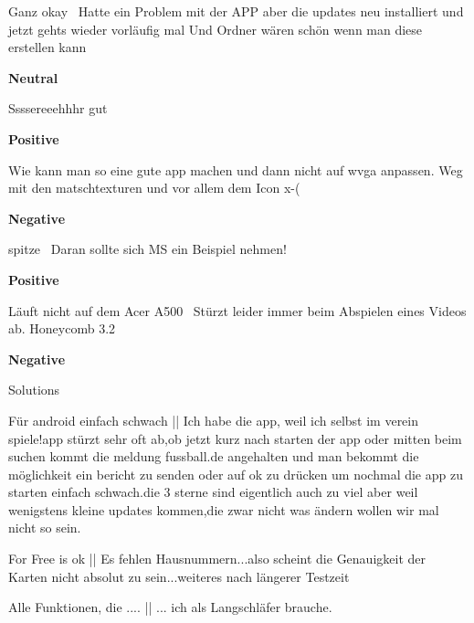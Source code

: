 \begin{examples}
  \item Ganz okay \textbar\textbar\ Hatte ein Problem mit der APP aber die updates neu installiert und jetzt gehts wieder vorläufig mal Und Ordner wären schön wenn man diese erstellen kann

        \textbf{Neutral}
  \item Ssssereeehhhr gut

        \textbf{Positive}
  \item Wie kann man so eine gute app machen und dann nicht auf wvga anpassen. Weg mit den matschtexturen und vor allem dem Icon x-(

        \textbf{Negative}
  \item spitze \textbar\textbar\ Daran sollte sich MS ein Beispiel nehmen!

        \textbf{Positive}
  \item Läuft nicht auf dem Acer A500 \textbar\textbar\ Stürzt leider immer beim Abspielen eines Videos ab. Honeycomb 3.2

        \textbf{Negative}
\end{examples}

Solutions

\begin{examples}
  \item \label{itm:scare1} Für android einfach schwach || Ich habe die app, weil ich selbst im verein spiele!app stürzt sehr oft ab,ob jetzt kurz nach starten der app oder mitten beim suchen kommt die meldung fussball.de angehalten und man bekommt die möglichkeit ein bericht zu senden oder auf ok zu drücken um nochmal die app zu starten einfach schwach.die 3 sterne sind eigentlich auch zu viel aber weil wenigstens kleine updates kommen,die zwar nicht was ändern wollen wir mal nicht so sein.
  \item \label{itm:scare2} For Free is ok || Es fehlen Hausnummern...also scheint die Genauigkeit der Karten nicht absolut zu sein...weiteres nach längerer Testzeit
  \item \label{itm:scare3} Alle Funktionen, die .... || ... ich als Langschläfer brauche.
\end{examples}

